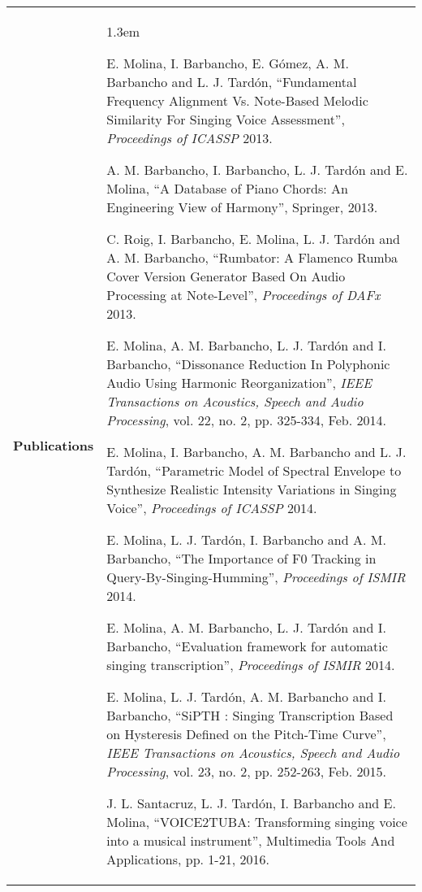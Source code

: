 \documentclass[letterpaper,11pt,oneside]{article}
\begin{document}
\noindent \begin{tabularx}{\linewidth}{l X}
\Large{\textbf{Publications}} & \begin{itemize*}
 \small
 \itemsep1.3em 
 \item E. Molina, I. Barbancho, E. Gómez, A. M. Barbancho and L. J. Tardón, ``Fundamental
Frequency Alignment Vs. Note-Based Melodic Similarity For Singing Voice Assessment'',
\textit{Proceedings of ICASSP} 2013.

 \item A. M. Barbancho, I. Barbancho, L. J. Tardón and E. Molina, ``A Database of Piano Chords: An Engineering View of Harmony'', Springer, 2013.
 
 \item C. Roig, I. Barbancho, E. Molina, L. J. Tardón and A. M. Barbancho, ``Rumbator: A
Flamenco Rumba Cover Version Generator Based On Audio Processing at Note-Level'',
\textit{Proceedings of DAFx} 2013.
 
 \item E. Molina, A. M. Barbancho, L. J. Tardón and I. Barbancho, ``Dissonance Reduction In Polyphonic
Audio Using Harmonic Reorganization'', \textit{IEEE Transactions on Acoustics, Speech
and Audio Processing}, vol. 22, no. 2, pp. 325-334, Feb. 2014.

  \item E. Molina, I. Barbancho, A. M. Barbancho and L. J. Tardón, ``Parametric Model of Spectral
Envelope to Synthesize Realistic Intensity Variations in Singing Voice'', \textit{Proceedings of
ICASSP} 2014.

  \item E. Molina, L. J. Tardón, I. Barbancho and A. M. Barbancho, ``The Importance of F0 Tracking
in Query-By-Singing-Humming'', \textit{Proceedings of ISMIR} 2014.

  \item E. Molina, A. M. Barbancho, L. J. Tardón and I. Barbancho, ``Evaluation framework for
automatic singing transcription'', \textit{Proceedings of ISMIR} 2014.

  \item E. Molina, L. J. Tardón, A. M. Barbancho and I. Barbancho, ``SiPTH : Singing Transcription
Based on Hysteresis Defined on the Pitch-Time Curve'', \textit{IEEE Transactions on Acoustics,
Speech and Audio Processing}, vol. 23, no. 2, pp. 252-263, Feb. 2015.

  \item J. L. Santacruz, L. J. Tardón, I. Barbancho and E. Molina, ``VOICE2TUBA: Transforming singing
voice into a musical instrument'', Multimedia Tools And Applications, pp. 1-21, 2016.


\end{itemize*}
\end{tabularx}
\end{document}
